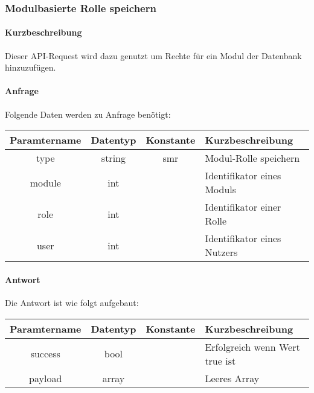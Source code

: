 \subsubsection{Modulbasierte Rolle speichern}
\paragraph{Kurzbeschreibung}Dieser API-Request wird dazu genutzt um Rechte für ein Modul der Datenbank hinzuzufügen.
\paragraph{Anfrage}Folgende Daten werden zu Anfrage benötigt:
\begin{table}[H]
	\begin{tabular}{|c|c|c|p{6.5cm}|}
		\hline
		\textbf{Paramtername} & \textbf{Datentyp} & \textbf{Konstante} & \textbf{Kurzbeschreibung}                                                                                               \\ \hline
		type                & string            & smr                & Modul-Rolle speichern \\ \hline
		module              & int               &                    & Identifikator eines Moduls \\ \hline
		role                & int               &                    & Identifikator einer Rolle \\ \hline
		user                & int               &                    & Identifikator eines Nutzers \\ \hline
	\end{tabular}
\end{table}
\paragraph{Antwort}Die Antwort ist wie folgt aufgebaut:
\begin{table}[H]
	\begin{tabular}{|c|c|c|p{6.5cm}|}
		\hline
		\textbf{Paramtername} & \textbf{Datentyp} & \textbf{Konstante} & \textbf{Kurzbeschreibung}            \\ \hline                
		success             & bool             &                 & Erfolgreich wenn Wert {\glqq true\grqq} ist \\ \hline
		payload             & array            &                 & Leeres Array \\ \hline
	\end{tabular}
\end{table}
